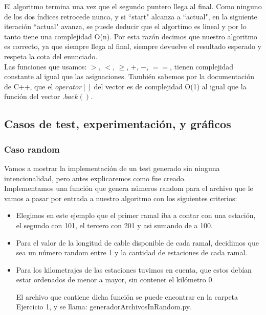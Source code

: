 El algoritmo termina una vez que el segundo puntero llega al final. Como ninguno de los dos índices retrocede nunca, y si ``start"$ $ alcanza a ``actual"$ $, en la siguiente iteración ``actual"$ $ avanza,  se puede deducir que el algortimo es lineal y por lo tanto tiene una complejidad O(n). Por esta razón decimos que nuestro algoritmo es correcto, ya que siempre llega al final, siempre devuelve el resultado esperado y respeta la cota del enunciado. \\

Las funciones que usamos: $>$, $<$, $\geq$, $+$, $-$, $==$, tienen complejidad constante al igual que las asignaciones. También sabemos por la documentación de C++, que el $operator[]$ del vector es de complejidad O(1) al igual que la función del vector $.back()$.\\

\subsection{Casos de test, experimentación, y gráficos}

\subsubsection{Caso random}
Vamos a mostrar la implementación de un test generado sin ninguna intencionalidad, pero antes explicaremos como fue creado. \\

Implementamos una función que genera números random para el archivo que le vamos a pasar por entrada a nuestro algoritmo con los siguientes criterios:
\begin{itemize}
\item Elegimos en este ejemplo que el primer ramal iba a contar con una estación, el segundo con 101, el tercero con 201 y asi sumando de a 100.
\item Para el valor de la longitud de cable disponible de cada ramal, decidimos que sea un número random entre 1 y la cantidad de estaciones de cada ramal.
\item Para los kilometrajes de las estaciones tuvimos en cuenta, que estos debían estar ordenados de menor a mayor, sin contener el kilómetro 0. 

El archivo que contiene dicha función se puede encontrar en la carpeta Ejercicio 1, y se llama: generadorArchivosInRandom.py.

\end{itemize}

